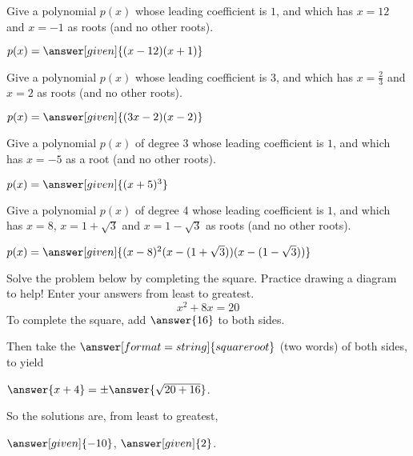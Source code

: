 \documentclass[nooutcomes]{ximera}
\begin{document}
\begin{problem}
Give a polynomial $p(x)$ whose leading coefficient is $1$, and which has $x=12$ and $x=-1$ as roots (and no other roots).

\begin{prompt}
	$p(x) = \answer[given]{(x-12)(x+1)}$
\end{prompt}
\end{problem}


\begin{problem}
Give a polynomial $p(x)$ whose leading coefficient is $3$, and which has $x=\frac{2}{3}$ and $x=2$ as roots (and no other roots).

\begin{prompt}
	$p(x) = \answer[given]{(3x-2)(x-2)}$
\end{prompt}
\end{problem}



\begin{problem}
Give a polynomial $p(x)$ of degree 3 whose leading coefficient is $1$, and which has $x=-5$ as a root (and no other roots).

\begin{prompt}
	$p(x) = \answer[given]{(x+5)^3}$
\end{prompt}
\end{problem}




\begin{problem}
Give a polynomial $p(x)$ of degree 4 whose leading coefficient is $1$, and which has $x=8$, $x=1+\sqrt{3}$ and $x = 1-\sqrt{3}$ as roots (and no other roots).

\begin{prompt}
	$p(x) = \answer[given]{(x-8)^2(x-(1+\sqrt{3}))(x-(1-\sqrt{3}))}$
\end{prompt}
\end{problem}



\begin{problem}
Solve the problem below by completing the square.  Practice drawing a diagram to help! Enter your answers from least to greatest.
\[
x^2 + 8x = 20
\]
To complete the square, add $\answer{16}$ to both sides.  
\begin{problem}
Then take the $\answer[format=string]{square root}$ (two words) of both sides, to yield
\begin{prompt}
$\answer{x+4} = \pm \answer{\sqrt{20+16}}$.
\end{prompt}

So the solutions are, from least to greatest,
\begin{prompt}
	$\answer[given]{-10}$, $\answer[given]{2}$.
\end{prompt}
\end{problem}
\end{problem}
\end{document}
